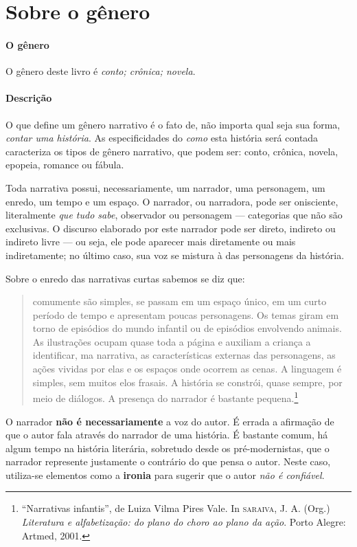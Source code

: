\documentclass[11pt]{extarticle}
\begin{document}
\section{Sobre o gênero}

\paragraph{O gênero} O gênero deste livro é \textit{conto; crônica; novela}.

\paragraph{Descrição} O que define um gênero narrativo é o fato de, não importa qual seja sua forma, \textit{contar uma história}.
As especificidades do \textit{como} esta história será contada caracteriza os tipos de gênero narrativo, que podem ser: conto, crônica, novela, epopeia, romance ou fábula. 

Toda narrativa possui, necessariamente, um narrador, uma personagem, um enredo, um tempo e um espaço. O narrador, ou narradora, pode ser onisciente, literalmente \textit{que tudo sabe}, observador ou personagem --- categorias que não são exclusivas. O discurso elaborado por este narrador pode ser direto, indireto ou indireto livre --- ou seja, ele pode aparecer mais diretamente ou mais indiretamente; no último caso, sua voz se mistura à das personagens da história.

Sobre o enredo das narrativas curtas sabemos se diz que:

\begin{quote}
comumente são simples, se passam em um espaço único, em um curto período de tempo e apresentam poucas personagens. Os temas giram em torno de episódios do mundo infantil ou de episódios envolvendo animais. As ilustrações ocupam quase toda a página e auxiliam 
a criança a identificar, ma narrativa, as características externas das personagens, as ações vividas por elas e os espaços onde ocorrem as cenas. A linguagem é simples, sem muitos elos frasais. A história se constrói, quase sempre, por meio de diálogos. A presença do narrador é bastante pequena.\footnote{“Narrativas infantis”, de Luiza Vilma Pires Vale. In \textsc{saraiva}, J. A. (Org.) \textit{Literatura e alfabetização: do plano do choro ao plano da ação}. Porto Alegre: Artmed, 2001.}  
\end{quote}

O narrador \textbf{não é necessariamente} a voz do autor. É errada a afirmação de que o autor fala através do narrador de uma história. É bastante comum, há algum tempo na história literária, sobretudo desde os pré-modernistas, que o narrador represente justamente o contrário do que pensa o autor. Neste caso, utiliza-se elementos como a \textbf{ironia} para sugerir que o autor \textit{não é confiável}.
\end{document}
